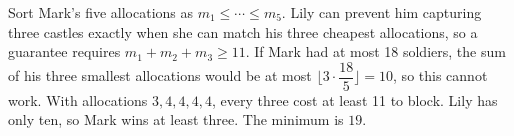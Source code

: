 Sort Mark's five allocations as $m_1\le\cdots\le m_5$. Lily can prevent him capturing three castles exactly when she can match his three cheapest allocations, so a guarantee requires $m_1+m_2+m_3\ge11$. If Mark had at most 18 soldiers, the sum of his three smallest allocations would be at most $\lfloor3\cdot\dfrac{18}{5}\rfloor=10$, so this cannot work. With allocations $3,4,4,4,4$, every three cost at least 11 to block. Lily has only ten, so Mark wins at least three. The minimum is $\boxed{19}$.
